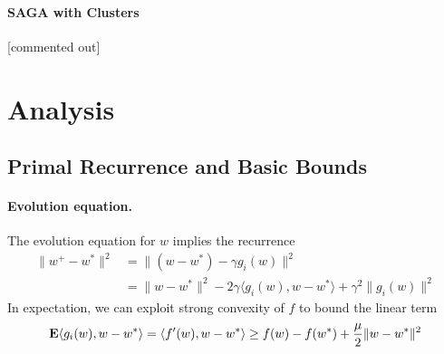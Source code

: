 \documentclass{article}
\newcommand{\E}{{\bf E}}
\begin{document}
\paragraph{SAGA with Clusters}  [commented out] 
%

\section{Analysis}

\subsection{Primal Recurrence and Basic Bounds} 

\paragraph{Evolution equation.} The evolution equation for $w$ implies the recurrence 
\begin{align}
\| w^+ - w^* \|^2 & = \| (w-w^*) - \gamma g_i(w) \|^2 \nonumber
\\ & = \| w - w^* \|^2 - 2 \gamma \langle g_i(w), w-w^*\rangle + \gamma^2 \| g_i(w) \|^2
\label{eq:recurrence}
\end{align}
In expectation, we can exploit strong convexity of $f$ to bound the linear term 
\begin{align}
\E \langle g_i(w), w-w^* \rangle  = \langle f'(w), w-w^* \rangle \ge  f(w) - f(w^*)+ \frac \mu 2  \| w-w^*\|^2
\label{eq:naive-strong-convexity}
\end{align}
\end{document}
